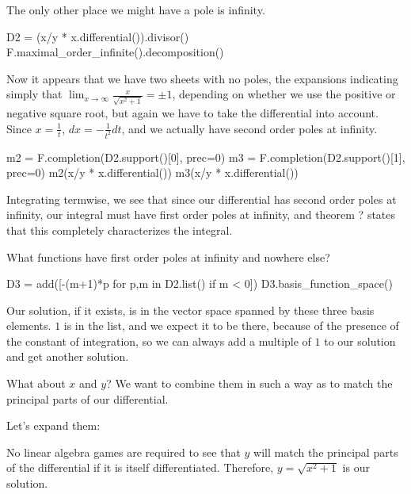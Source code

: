The only other place we might have a pole is infinity.

\begin{sageblock}[riemannroch2]
D2 = (x/y * x.differential()).divisor()
F.maximal_order_infinite().decomposition()
\end{sageblock}

Now it appears that we have two sheets with no poles, the expansions indicating simply
that $\lim_{x\to\infty}\frac{x}{\sqrt{x^2+1}} = \pm 1$, depending
on whether we use the positive or negative square root,
but again
we have to take the differential into account.  Since $x=\frac{1}{t}$,
$dx=-\frac{1}{t^2} dt$, and we actually have second order poles
at infinity.

\begin{sageblock}[riemannroch2]
m2 = F.completion(D2.support()[0], prec=0)
m3 = F.completion(D2.support()[1], prec=0)
m2(x/y * x.differential())
m3(x/y * x.differential())
\end{sageblock}

Integrating termwise, we see that since our differential has second
order poles at infinity, our integral must have first order poles
at infinity, and theorem ? states that this completely
characterizes the integral.


What functions have first order poles at infinity and nowhere else?

\begin{sageblock}[riemannroch2]
D3 = add([-(m+1)*p for p,m in D2.list() if m < 0])
D3.basis_function_space()
\end{sageblock}

Our solution, if it exists, is in the vector space spanned by these
three basis elements.  $1$ is in the list, and we expect it to be
there, because of the presence of the constant of integration, so we
can always add a multiple of $1$ to our solution and get another
solution.

What about $x$ and $y$?  We want to
combine them in such a way as to match the principal parts of
our differential.

Let's expand them:

\begin{sageblock}[riemannroch2]
[m2(x), m3(x)]
[m2(y), m3(y)]
\end{sageblock}

No linear algebra games are required to see that $y$ will match the
principal parts of the differential if it is itself differentiated.
Therefore, $y=\sqrt{x^2+1}$ is our solution.

